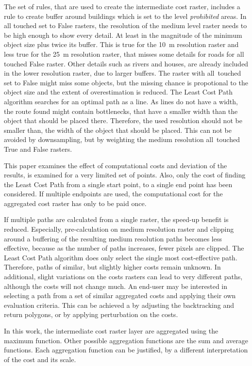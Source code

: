 The set of rules, that are used to create the intermediate cost raster, includes a rule to create buffer around buildings which is set to the level \textit{prohibited} areas.
In all touched set to False rasters, the resolution of the medium level raster needs to be high enough to show every detail.
At least in the magnitude of the minimum object size plus twice its buffer.
This is true for the 10~m resolution raster and less true for the 25~m resolution raster, that misses some details for roads for all touched False raster.
Other details such as rivers and houses, are already included in the lower resolution raster, due to larger buffers.
The raster with all~touched set to False might miss some objects, but the missing chance is propotional to the object size and the extent of overestimation is reduced.
The Least Cost Path algorithm searches for an optimal path as a line.
As lines do not have a width, the route found might contain bottlenecks, that have a smaller width than the object that should be placed there.
Therefore, the used resolution should not be smaller than, the width of the object that should be placed.
This can not be avoided by downsampling, but by weighting the medium resolution all~touched True and False rasters.


This paper examines the effect of computational costs and deviation of the results, is examined for a very limited set of points.
Also, only the cost of finding the Least Cost Path from a single start point, to a single end point has been considered.
If multiple endpoints are used, the computational cost for the aggregated cost raster has only to be paid once.

If multiple paths are calculated from a single raster, the speed-up benefit is reduced.
Especially, pre-calculation on medium resolution raster and clipping around a buffering of the resulting medium resolution paths becomes less effective, because as the number of paths increases, fewer pixels are clipped.
The Least Cost Path algorithm does only select the single most cost-effective path.
Therefore, paths of similar, but slightly higher costs remain unknown.
In additional, slight variations on the costs rasters can lead to very different paths, although the costs will not change much.
An end-user may be interested in selecting a path from a set of similar aggregated costs and applying their own evaluation criteria.
This can be achieved a by adjusting the backtracking and return polygons, or by applying perturbation on the costs.

In this work, the intermediate cost raster layer are aggregated using the maximum function. 
Other possible aggregation functions are the sum and average functions.
Each aggregation function can be justified, by a different interpretation of the cost and its scale.

